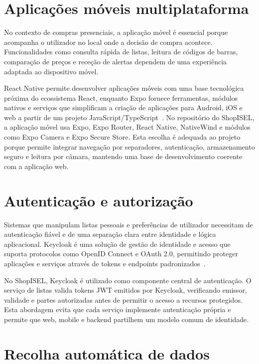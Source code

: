 \section{Aplicações móveis multiplataforma}
\label{sec:2.5}

No contexto de compras presenciais, a aplicação móvel é essencial porque acompanha o
utilizador no local onde a decisão de compra acontece. Funcionalidades como consulta
rápida de listas, leitura de códigos de barras, comparação de preços e receção de
alertas dependem de uma experiência adaptada ao dispositivo móvel.

React Native permite desenvolver aplicações móveis com uma base tecnológica próxima
do ecossistema React, enquanto Expo fornece ferramentas, módulos nativos e serviços
que simplificam a criação de aplicações para Android, iOS e web a partir de um
projeto JavaScript/TypeScript~\cite{expo-introduction}. No repositório do ShopISEL,
a aplicação móvel usa Expo, Expo Router, React Native, NativeWind e módulos como
Expo Camera e Expo Secure Store. Esta escolha é adequada ao projeto porque permite
integrar navegação por separadores, autenticação, armazenamento seguro e leitura por
câmara, mantendo uma base de desenvolvimento coerente com a aplicação web.

\section{Autenticação e autorização}
\label{sec:2.6}

Sistemas que manipulam listas pessoais e preferências de utilizador necessitam de
autenticação fiável e de uma separação clara entre identidade e lógica aplicacional.
Keycloak é uma solução de gestão de identidade e acesso que suporta protocolos como
OpenID Connect e OAuth 2.0, permitindo proteger aplicações e serviços através de
tokens e endpoints padronizados~\cite{keycloak-oidc}.

No ShopISEL, Keycloak é utilizado como componente central de autenticação. O serviço
de listas valida tokens \ac{JWT} emitidos por Keycloak, verificando emissor, validade
e partes autorizadas antes de permitir o acesso a recursos protegidos. Esta abordagem
evita que cada serviço implemente autenticação própria e permite que web, mobile e
backend partilhem um modelo comum de identidade.

\section{Recolha automática de dados}
\label{sec:2.7}

